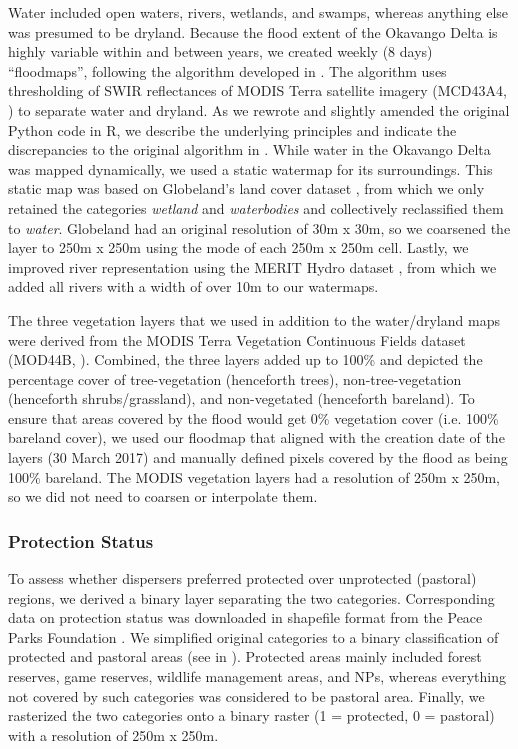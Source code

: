 \documentclass[abstract=on,10pt,a4paper,bibliography=totocnumbered]{scrartcl}
\begin{document}
Water included open waters, rivers, wetlands, and swamps, whereas anything else
was presumed to be dryland. Because the flood extent of the Okavango Delta is
highly variable within and between years, we created weekly (8 days)
``floodmaps'', following the algorithm developed in \cite{Wolski.2017}. The
algorithm uses thresholding of SWIR reflectances of MODIS Terra satellite
imagery (MCD43A4, \cite{Schaaf.2015}) to separate water and dryland. As we
rewrote and slightly amended the original Python code in R, we describe the
underlying principles and indicate the discrepancies to the original algorithm
in . While water in the Okavango Delta was
mapped dynamically, we used a static watermap for its surroundings. This static
map was based on Globeland's land cover dataset \citep{Chen.2015}, from which we
only retained the categories \textit{wetland} and \textit{waterbodies} and
collectively reclassified them to \textit{water}. Globeland had an original
resolution of 30m x 30m, so we coarsened the layer to 250m x 250m using the mode
of each 250m x 250m cell. Lastly, we improved river representation using the
MERIT Hydro dataset \citep{Yamazaki.2019}, from which we added all rivers with a
width of over 10m to our watermaps.

The three vegetation layers that we used in addition to the water/dryland maps
were derived from the MODIS Terra Vegetation Continuous Fields dataset (MOD44B,
\cite{Dimiceli.2015}). Combined, the three layers added up to 100\% and depicted
the percentage cover of tree-vegetation (henceforth trees), non-tree-vegetation
(henceforth shrubs/grassland), and non-vegetated (henceforth bareland). To
ensure that areas covered by the flood would get 0\% vegetation cover (i.e.
100\% bareland cover), we used our floodmap that aligned with the creation date
of the layers (30 March 2017) and manually defined pixels covered by the flood
as being 100\% bareland. The MODIS vegetation layers had a resolution of 250m x
250m, so we did not need to coarsen or interpolate them.

\subsubsection{Protection Status}
To assess whether dispersers preferred protected over unprotected (pastoral)
regions, we derived a binary layer separating the two categories. Corresponding
data on protection status was downloaded in shapefile format from the Peace
Parks Foundation \citep{PeaceParks.2019}. We simplified original categories to a
binary classification of protected and pastoral areas (see
 in ). Protected areas
mainly included forest reserves, game reserves, wildlife management areas, and
NPs, whereas everything not covered by such categories was considered to be
pastoral area. Finally, we rasterized the two categories onto a binary raster (1
= protected, 0 = pastoral) with a resolution of 250m x 250m.
\end{document}
